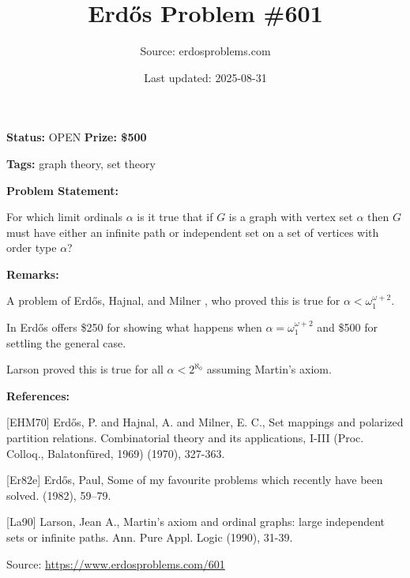 \documentclass{article}
\title{Erd\H{o}s Problem \#601}
\date{Last updated: 2025-08-31}
\author{Source: erdosproblems.com}
\begin{document}
\maketitle

\noindent\textbf{Status:} OPEN \quad \textbf{Prize: \$500}

\noindent\textbf{Tags:} graph theory, set theory

\medskip
\noindent\textbf{Problem Statement:}

For which limit ordinals $\alpha$ is it true that if $G$ is a graph with vertex set $\alpha$ then $G$ must have either an infinite path or independent set on a set of vertices with order type $\alpha$?

\bigskip
\noindent\textbf{Remarks:}

A problem of Erd\H{o}s, Hajnal, and Milner \cite{EHM70}, who proved this is true for $\alpha < \omega_1^{\omega+2}$. 

In \cite{Er82e} Erd\H{o}s offers \$250 for showing what happens when $\alpha=\omega_1^{\omega+2}$ and \$500 for settling the general case.

Larson \cite{La90} proved this is true for all $\alpha<2^{\aleph_0}$ assuming Martin's axiom.

\bigskip
\noindent\textbf{References:}

[EHM70] Erd\H{o}s, P. and Hajnal, A. and Milner, E. C., Set mappings and polarized partition relations. Combinatorial theory and its applications, I-III (Proc.
Colloq., Balatonf\"{u}red, 1969) (1970), 327-363.
 
 [Er82e] Erd\H{o}s, Paul, Some of my favourite problems which recently have been solved. (1982), 59--79.
 
 [La90] Larson, Jean A., Martin's axiom and ordinal graphs: large independent sets or infinite paths. Ann. Pure Appl. Logic (1990), 31-39.

\bigskip
\noindent\small{Source: \url{https://www.erdosproblems.com/601}}
\end{document}
